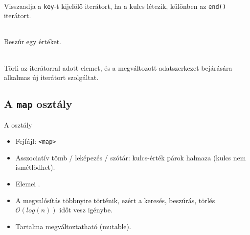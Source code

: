 \begin{frame}
    \begin{description}[m]
        \item[\hiv{\href{https://en.cppreference.com/w/cpp/container/set/find}{\texttt{find(key)}}}] \hfill \\ Visszaadja a \texttt{key}-t kijelölő iterátort, ha a kulcs létezik, különben az \texttt{end()} iterátort.
        \item[\hiv{\href{https://en.cppreference.com/w/cpp/container/set/insert}{\texttt{insert(value)}}}] \hfill \\ Beszúr egy értéket.
        \item[\hiv{\href{https://en.cppreference.com/w/cpp/container/set/erase}{\texttt{erase(pos)}}}] \hfill \\ Törli az iterátorral adott elemet, és a megváltozott adatszerkezet bejárására alkalmas új iterátort szolgáltat.
    \end{description}
\end{frame}

\subsection{A \texttt{map} osztály}

\begin{frame}
    A  osztály
    \begin{itemize}
        \item Fejfájl: \texttt{<map>}
        \item Asszociatív tömb / leképezés / szótár: kulcs-érték párok halmaza (kulcs nem ismétlődhet).
        \item Elemei .
        \item A megvalósítás többnyire  történik, ezért a keresés, beszúrás, törlés $\mathcal{O}\left(log(n)\right)$ időt vesz igénybe.
        \item Tartalma megváltoztatható (mutable).
    \end{itemize}
\end{frame}

\begin{frame}
    \begin{exampleblock}{}
        
    \end{exampleblock}
\end{frame}

